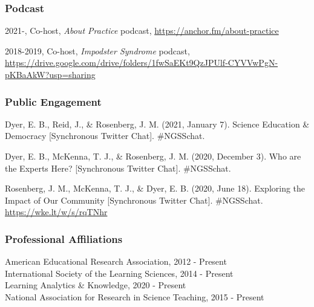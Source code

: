 \documentclass[
  14,
]{article}
\begin{document}
\hypertarget{podcast}{%
\subsubsection{Podcast}\label{podcast}}

2021-, Co-host, \emph{About Practice} podcast,
\url{https://anchor.fm/about-practice}

2018-2019, Co-host, \emph{Impodster Syndrome} podcast,
\url{https://drive.google.com/drive/folders/1fwSaEKt9QzJPUlf-CYVVwPgN-pKBaAkW?usp=sharing}

\hypertarget{public-engagement}{%
\subsubsection{Public Engagement}\label{public-engagement}}

Dyer, E. B., Reid, J., \& Rosenberg, J. M. (2021, January 7). Science
Education \& Democracy {[}Synchronous Twitter Chat{]}. \#NGSSchat.

Dyer, E. B., McKenna, T. J., \& Rosenberg, J. M. (2020, December 3). Who
are the Experts Here? {[}Synchronous Twitter Chat{]}. \#NGSSchat.

Rosenberg, J. M., McKenna, T. J., \& Dyer, E. B. (2020, June 18).
Exploring the Impact of Our Community {[}Synchronous Twitter Chat{]}.
\#NGSSchat. \url{https://wke.lt/w/s/rqTNhr}

\hypertarget{professional-affiliations}{%
\subsubsection{Professional
Affiliations}\label{professional-affiliations}}

American Educational Research Association, 2012 - Present\\
International Society of the Learning Sciences, 2014 - Present\\
Learning Analytics \& Knowledge, 2020 - Present\\
National Association for Research in Science Teaching, 2015 - Present
\end{document}
